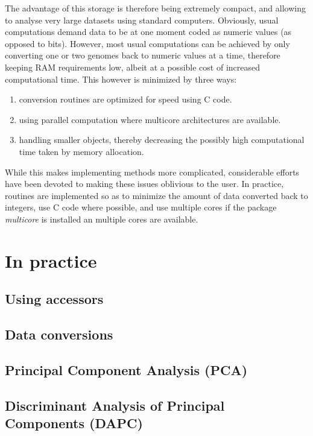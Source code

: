 \documentclass{article}
\begin{document}
The advantage of this storage is therefore being extremely compact, and allowing to analyse very large
datasets using standard computers.
Obviously, usual computations demand data to be at one moment coded as numeric values (as opposed to bits).
However, most usual computations can be achieved by only converting one or two genomes back to numeric values
at a time, therefore keeping RAM requirements low, albeit at a possible cost of increased computational time.
This however is minimized by three ways:
\begin{enumerate}
\item conversion routines are optimized for speed using C code.
\item using parallel computation where multicore architectures are available.
\item handling smaller objects, thereby decreasing the possibly high computational time taken by memory allocation.
\end{enumerate}

While this makes implementing methods more complicated, considerable efforts have been devoted to
making these issues oblivious to the user. In practice, routines are implemented so as to minimize
the amount of data converted back to integers, use C code where possible, and use multiple cores
if the package \textit{multicore} is installed an multiple cores are available.




\section{In practice}




\subsection{Using accessors}



\subsection{Data conversions}




\subsection{Principal Component Analysis (PCA)}



\subsection{Discriminant Analysis of Principal Components (DAPC)}
\end{document}
